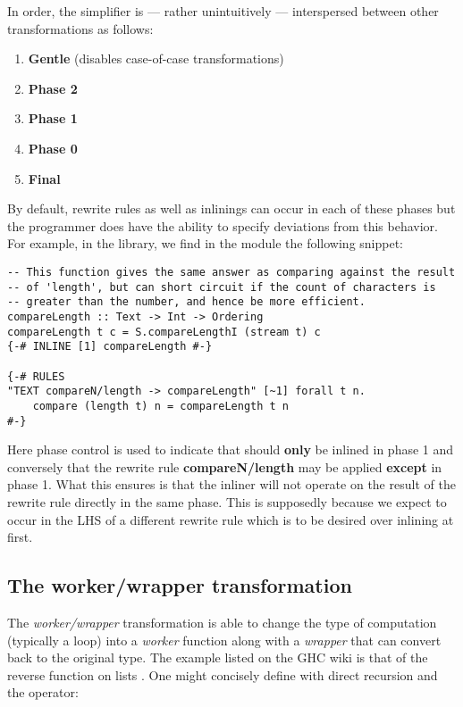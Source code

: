 In order, the simplifier is --- rather unintuitively --- interspersed between other transformations as follows:

\begin{enumerate}
  \item \textbf{Gentle} (disables case-of-case transformations)
  \item \textbf{Phase 2}
  \item \textbf{Phase 1}
  \item \textbf{Phase 0}
  \item \textbf{Final}
\end{enumerate}

By default, rewrite rules as well as inlinings can occur in each of these phases but the programmer does have the ability
to specify deviations from this behavior. For example, in the  library, we find in the  module
the following snippet:

\begin{listing}[H]
\begin{verbatim}
-- This function gives the same answer as comparing against the result
-- of 'length', but can short circuit if the count of characters is
-- greater than the number, and hence be more efficient.
compareLength :: Text -> Int -> Ordering
compareLength t c = S.compareLengthI (stream t) c
{-# INLINE [1] compareLength #-}

{-# RULES
"TEXT compareN/length -> compareLength" [~1] forall t n.
    compare (length t) n = compareLength t n
#-}
\end{verbatim}
\end{listing}

Here phase control is used to indicate that  should \textbf{only} be inlined in phase 1 and conversely
that the rewrite rule \textbf{compareN/length} may be applied \textbf{except} in phase 1. What this ensures is that the inliner
will not operate on the result of the rewrite rule directly in the same phase. This is supposedly because we expect 
to occur in the LHS of a different rewrite rule which is to be desired over inlining at first.

\subsection{The worker/wrapper transformation}
\label{section:background:worker_wrapper}

The \textit{worker/wrapper} transformation is able to change the type of computation (typically a loop) into a \textit{worker} function
along with a \textit{wrapper} that can convert back to the original type. The example listed on the GHC wiki is that of the reverse
function on lists \cite{ghc_wiki_wwrapper}. One might concisely define with direct recursion and the \mono{++} operator:

